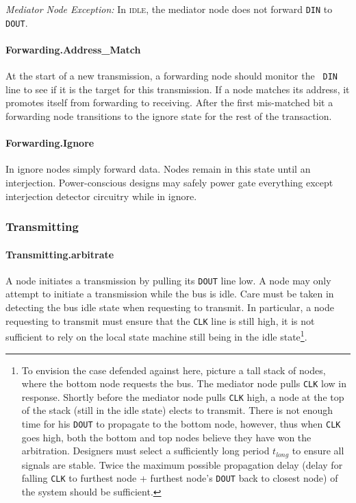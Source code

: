 \medskip
\noindent
{\em Mediator Node Exception:} In \textsc{idle}, the mediator node does not
forward {\tt DIN} to {\tt DOUT}.

\paragraph{Forwarding.{\sc Address\_Match}}
At the start of a new transmission, a forwarding node should monitor the {\tt
DIN} line to see if it is the target for this transmission. If a node matches
its address, it promotes itself from forwarding to receiving. After the first
mis-matched bit a forwarding node transitions to the {\sc ignore} state for
the rest of the transaction.

\paragraph{Forwarding.{\sc Ignore}}
In {\sc ignore} nodes simply forward data. Nodes remain in this state until
an interjection. Power-conscious designs may safely power gate everything
except interjection detector circuitry while in {\sc ignore}.

\subsubsection{Transmitting}

\paragraph{Transmitting.{\sc arbitrate}}
\label{sec:state-arbitrate}
A node initiates a transmission by pulling its {\tt DOUT} line low. A node may
only attempt to initiate a transmission while the bus is idle. Care must be
taken in detecting the bus idle state when requesting to transmit. In
particular, a node requesting to transmit must ensure that the {\tt CLK} line
is still high, it is not sufficient to rely on the local state machine still
being in the {\sc idle} state\footnote{To envision the case defended against
here, picture a tall stack of nodes, where the bottom node requests the bus.
The mediator node pulls {\tt CLK} low in response. Shortly before the mediator
node pulls {\tt CLK} high, a node at the top of the stack (still in the {\sc
idle} state) elects to transmit. There is not enough time for his {\tt DOUT}
to propagate to the bottom node, however, thus when {\tt CLK} goes high, both
the bottom and top nodes believe they have won the arbitration. Designers must
select a sufficiently long period $t_{long}$ to ensure all signals are stable.
Twice the maximum possible propagation delay (delay for falling {\tt CLK} to
furthest node + furthest node's {\tt DOUT} back to closest node) of the system
should be sufficient.}.

